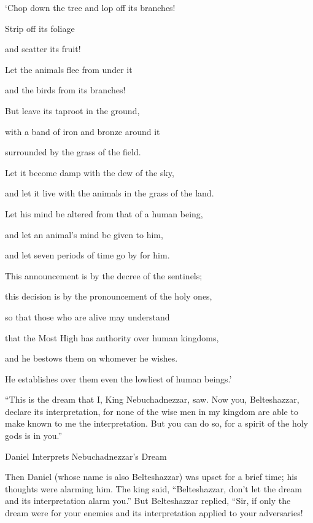 {\par }{\Q ‘Chop down
the tree
and lop off
its branches!
\par }{\Q Strip off
its foliage
\par }{\Q and scatter
its fruit!
\par }{\Q Let the animals
flee
from
under
it
\par }{\Q and the birds
from
its branches!
\par }{\Q {}But
leave
its taproot
in the ground,
\par }{\Q with a band
of iron
and bronze
around it

\par }{\Q surrounded by the grass
of the field.
\par }{\Q Let it become
damp
with the dew
of the sky,
\par }{\Q and let it live
with
the animals
in the grass
of the land.
\par }{\Q {}Let his mind
be altered
from
that of a human being,
\par }{\Q and let an animal’s
mind
be given
to him,
\par }{\Q and let seven periods
of time
go by
for him.
\par }{\Q {}This announcement
is by the decree
of the sentinels;
\par }{\Q this decision
is by the pronouncement
of the holy ones,
\par }{\Q so
that those
who
are alive
may understand
\par }{\Q that the Most High
has authority
over human
kingdoms,
\par }{\Q and he bestows
them on whomever
he wishes.
\par }{\Q He establishes
over
them even the lowliest
of human beings.’
\par }{\PP {}“This
is the dream
that I,
King
Nebuchadnezzar,
saw.
Now you,
Belteshazzar,
declare
its interpretation,
for none
of the wise men
in my kingdom
are able
to make known
to me the interpretation.
But you
can do
so, for
a spirit
of the holy
gods is in you.”
\par }{\SH Daniel Interprets Nebuchadnezzar’s Dream
\par }{\PP {}Then
Daniel
(whose
name
is also Belteshazzar) was upset
for a brief
time;
his thoughts
were alarming
him. The king
said,
“Belteshazzar,
don’t
let the dream
and its interpretation
alarm
you.” But Belteshazzar
replied,
“Sir,
if only the dream
were for
your enemies
and its interpretation
applied to your adversaries!
}
